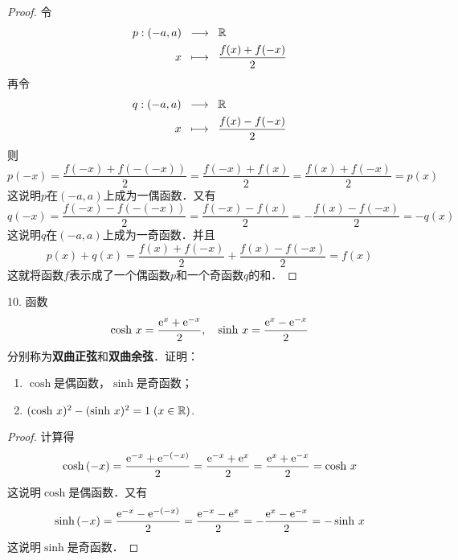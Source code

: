 \begin{proof}
令
\begin{align}
    p: (-a, a) \;\; &\longrightarrow \;\; \mathbb{R} \\
    x \;\; &\longmapsto \;\; \displaystyle\frac{f(x)+f(-x)}{2}
\end{align}
再令
\begin{align}
    q: (-a, a) \;\; &\longrightarrow \;\; \mathbb{R} \\
    x \;\; &\longmapsto \;\; \displaystyle\frac{f(x)-f(-x)}{2}
\end{align}
则
\begin{equation}
    p(-x) = \displaystyle\frac{f(-x)+f(-(-x))}{2} = \displaystyle\frac{f(-x)+f(x)}{2} = \displaystyle\frac{f(x)+f(-x)}{2} = p(x)
\end{equation}
这说明$p$在$(-a, a)$上成为一偶函数．又有
\begin{equation}
    q(-x) = \displaystyle\frac{f(-x)-f(-(-x))}{2} = \displaystyle\frac{f(-x)-f(x)}{2} = -\displaystyle\frac{f(x)-f(-x)}{2} = -q(x)
\end{equation}
这说明$q$在$(-a, a)$上成为一奇函数．并且
\begin{equation}
    p(x)+q(x) = \displaystyle\frac{f(x)+f(-x)}{2} + \displaystyle\frac{f(x)-f(-x)}{2} = f(x)
\end{equation}
这就将函数$f$表示成了一个偶函数$p$和一个奇函数$q$的和．
\end{proof}

10. 函数
\begin{equation}
    \cosh \, x = \frac{\mathrm{e}^x + \mathrm{e}^{-x}}{2}, \quad \sinh \, x = \frac{\mathrm{e}^{x} - \mathrm{e}^{-x}}{2}
\end{equation}
分别称为{\bfseries{双曲正弦}}和{\bfseries{双曲余弦}}．证明：
\begin{enumerate}
    \item $\cosh$是偶函数，$\sinh$是奇函数；
    \item $(\cosh \, x)^2 - (\sinh \, x)^2 = 1 \; (x \in \mathbb{R})$.
\end{enumerate}

\begin{proof}
计算得
\begin{equation}
    \cosh \, (-x) = \frac{\mathrm{e}^{-x} + \mathrm{e}^{-(-x)}}{2} = \frac{\mathrm{e}^{-x}+\mathrm{e}^{x}}{2} = \frac{\mathrm{e}^x + \mathrm{e}^{-x}}{2} = \cosh \, x
\end{equation}
这说明$\cosh$是偶函数．又有
\begin{equation}
    \sinh \, (-x) = \frac{\mathrm{e}^{-x} - \mathrm{e}^{-(-x)}}{2} = \frac{\mathrm{e}^{-x}-\mathrm{e}^{x}}{2} = - \frac{\mathrm{e}^{x} - \mathrm{e}^{-x}}{2} = - \sinh \, x
\end{equation}
这说明$\sinh$是奇函数．
\end{proof}

